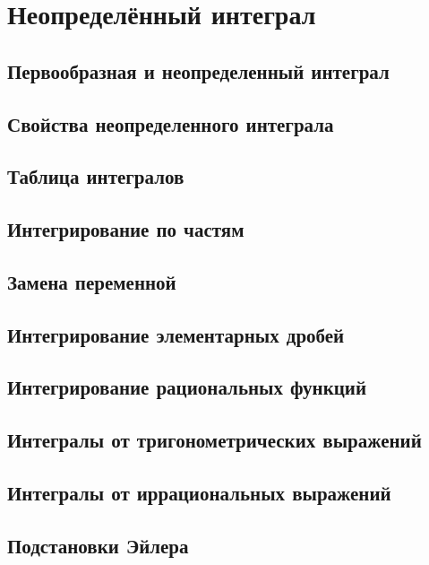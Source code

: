 \section{Неопределённый интеграл}
\subsection{Первообразная и неопределенный интеграл}

\subsection{Свойства неопределенного интеграла}

\subsection{Таблица интегралов}

\subsection{Интегрирование по частям}

\subsection{Замена переменной}

\subsection{Интегрирование элементарных дробей}

\subsection{Интегрирование рациональных функций}

\subsection{Интегралы от тригонометрических выражений}

\subsection{Интегралы от иррациональных выражений}

\subsection{Подстановки Эйлера}


